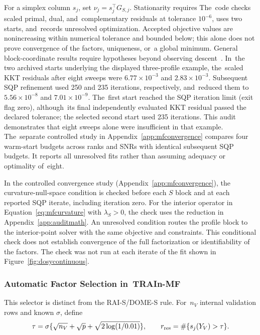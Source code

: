 \documentclass[mathematics,article,accept,moreauthors]{Definitions/mdpi}
\newcommand{\one}{\mathbf{1}}
\begin{document}
For a simplex column $s_j$, set $\nu_j=s_j^\top G_{S,j}$. Stationarity requires \textls[-35]{$G_{S,j}-\nu_j\one\geq0$ and $s_j\odot(G_{S,j}-\nu_j\one)=0$,}  The~code checks scaled primal, dual, and~complementary residuals at tolerance $10^{-6}$, uses two starts, and~records unresolved optimization. Accepted objective values are nonincreasing within numerical tolerance and bounded below; this alone does not prove convergence of the factors, uniqueness, or~a global minimum. General block-coordinate results require hypotheses beyond observing descent~\cite{tseng}. In~the two archived starts underlying the displayed three-profile example, the~scaled KKT residuals after eight sweeps were $6.77\times10^{-3}$ and $2.83\times10^{-3}$. Subsequent SQP refinement used 250 and 235 iterations, respectively, and~reduced them to $5.56\times10^{-8}$ and $7.01\times10^{-9}$. The~first start reached the SQP iteration limit (exit flag zero), although~its final independently evaluated KKT residual passed the declared tolerance; the selected second start used 235 iterations. This audit demonstrates that eight sweeps alone were insufficient in that example. The~separate controlled study in Appendix~\ref{app:mfconvergence} compares four warm-start budgets across ranks and SNRs with identical subsequent SQP budgets. It reports all unresolved fits rather than assuming adequacy or optimality of~eight.


In the controlled convergence study (Appendix~\ref{app:mfconvergence}), the curvature-null-space condition is checked before each $S$ block and at each reported SQP iterate, including iteration zero. For the interior operator in Equation~\eqref{eq:mfcurvature} with $\lambda_S>0$, the check uses the reduction in Appendix~\ref{app:auditmath}. An unresolved condition routes the profile block to the interior-point solver with the same objective and constraints. This conditional check does not establish convergence of the full factorization or identifiability of the factors. The check was not run at each iterate of the fit shown in Figure~\ref{fig:dosycontinuous}.

\subsubsection{Automatic Factor Selection in~TRAIn-MF}
This selector is distinct from the RAI-S/DOME-S rule. For~$n_V$ internal validation rows and known $\sigma$, define
\begin{equation}\label{eq:mfrank}
 \tau=\sigma\{\sqrt{n_V}+\sqrt p+\sqrt{2\log(1/0.01)}\},\qquad
 r_{\rm res}=\#\{s_j(Y_V)>\tau\}.
\end{equation}
\end{document}
